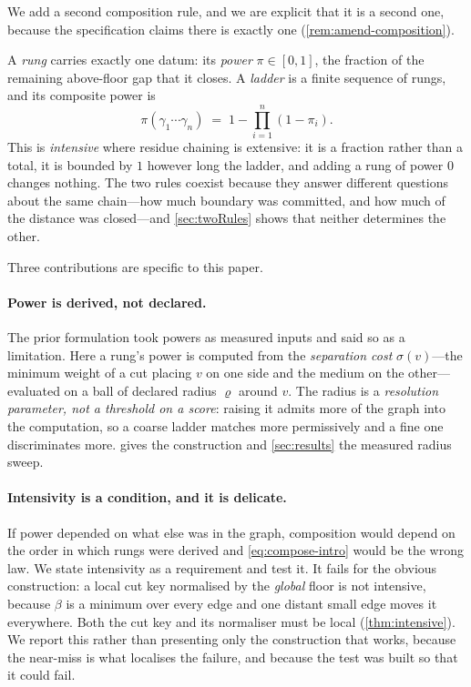 \documentclass[11pt,twocolumn,a4paper]{article}
\theoremstyle{plain}
\theoremstyle{definition}
\theoremstyle{remark}
\newcommand{\flo}{\beta}
\newcommand{\sepc}{\sigma}
\newcommand{\pow}{\pi}
\newcommand{\Rung}{\gamma}
\newcommand{\rad}{\varrho}
\begin{document}
We add a second composition rule, and we are explicit that it is a second one,
because the specification claims there is exactly one
(\cref{rem:amend-composition}).

A \emph{rung} carries exactly one datum: its \emph{power} $\pow\in[0,1]$, the
fraction of the remaining above-floor gap that it closes. A \emph{ladder} is a
finite sequence of rungs, and its composite power is
\begin{equation}
\pow(\Rung_1\cdots\Rung_n) \;=\; 1-\prod_{i=1}^{n}(1-\pow_i).
\label{eq:compose-intro}
\end{equation}
This is \emph{intensive} where residue chaining is extensive: it is a fraction
rather than a total, it is bounded by $1$ however long the ladder, and adding a
rung of power $0$ changes nothing. The two rules coexist because they answer
different questions about the same chain---how much boundary was committed,
and how much of the distance was closed---and \cref{sec:twoRules} shows that
neither determines the other.

Three contributions are specific to this paper.

\paragraph{Power is derived, not declared.} The prior formulation took powers
as measured inputs and said so as a limitation. Here a rung's power is computed
from the \emph{separation cost} $\sepc(v)$---the minimum weight of a cut
placing $v$ on one side and the medium on the other---evaluated on a ball of
declared radius $\rad$ around $v$. The radius is a \emph{resolution parameter,
not a threshold on a score}: raising it admits more of the graph into the
computation, so a coarse ladder matches more permissively and a fine one
discriminates more.  gives the construction and
\cref{sec:results} the measured radius sweep.

\paragraph{Intensivity is a condition, and it is delicate.} If power depended
on what else was in the graph, composition would depend on the order in which
rungs were derived and \cref{eq:compose-intro} would be the wrong law. We
state intensivity as a requirement and test it. It fails for the obvious
construction: a local cut key normalised by the \emph{global} floor is not
intensive, because $\flo$ is a minimum over every edge and one distant small
edge moves it everywhere. Both the cut key and its normaliser must be local
(\cref{thm:intensive}). We report this rather than presenting only the
construction that works, because the near-miss is what localises the failure,
and because the test was built so that it could fail.
\end{document}
